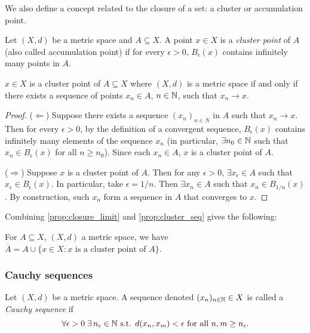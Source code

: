 \documentclass{article}
\begin{document}
We also define a concept related to the closure of a set: a cluster or accumulation point.

\begin{definition}
Let $(X,d)$ be a metric space and $A \subseteq X$. A point $x \in X$ is a \emph{cluster point} of $A$ (also called accumulation point) if for every $\epsilon >0$, $B_\epsilon(x)$ contains infinitely many points in $A$.
\end{definition}


\begin{proposition}
\label{prop:cluster_seq}
 $x \in X$ is a cluster point of $A \subseteq X$ where $(X,d)$ is a metric space if and only if there exists a sequence of points $x_n \in A$, $n \in {\mathbb{N}}$, such that $x_n \to x$.
\end{proposition}

\begin{proof}
($\Leftarrow$) Suppose there exists a sequence $(x_n)_{n \in N}$ in $A$ such that $x_n \to x$. Then for every $\epsilon >0$, by the definition of a convergent sequence, $B_\epsilon(x)$ contains infinitely many elements of the sequence $x_n$ (in particular, $\exists n_0 \in {\mathbb{N}}$ such that $x_n \in B_\epsilon(x)$ for all $n \geq n_0$). Since each $x_n \in A$, $x$ is a cluster point of $A$.

($\Rightarrow$) Suppose $x$ is a cluster point of $A$. Then for any $\epsilon > 0$, $\exists x_\epsilon \in A$ such that $x_\epsilon \in B_\epsilon(x)$. In particular, take $\epsilon = 1/n$. Then $\exists x_n \in A$ such that $x_n\in B_{1/n}(x)$. By construction, such $x_n$ form a sequence in $A$ that converges to $x$. 

\end{proof}

Combining \cref{prop:closure_limit} and \cref{prop:cluster_seq} gives the following: 

\begin{corollary}
For $A \subseteq X$, $(X,d)$ a metric space, we have $\overline{A} = A \cup \{x \in X : x \text{ is a cluster point of }A \}$.
\end{corollary}

\subsubsection{Cauchy sequences}

\begin{definition}
Let $(X,d)$ be a metric space. A sequence denoted $(x_n)_{n \in {\mathbb{N}}} \in X$ is called a \emph{Cauchy sequence} if
\begin{equation*}
    \forall \epsilon >0  \; \exists \, n_\epsilon \in {\mathbb{N}} \text{ s.t. } d(x_n,x_m) < \epsilon \text{ for all } n,m \geq n_\epsilon .
\end{equation*}
\end{definition}
\end{document}
